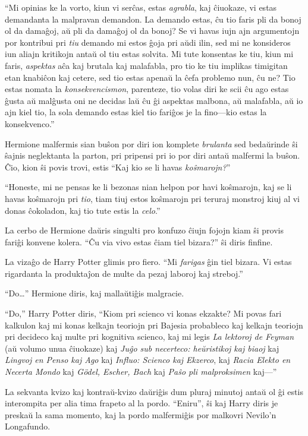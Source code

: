 ``Mi opinias ke la vorto, kiun vi serĉas, estas \emph{agrabla}, kaj
ĉiuokaze, vi estas demandanta la malpravan demandon. La demando estas,
ĉu tio faris pli da bonoj ol da damaĝoj, aŭ pli da damaĝoj ol da
bonoj? Se vi havas iujn ajn argumentojn por kontribui pri \emph{tiu}
demando mi estos ĝoja pri aŭdi ilin, sed mi ne konsideros iun aliajn
kritikojn antaŭ ol tiu estas solvita. Mi tute konsentas ke tiu, kiun
mi faris, \emph{aspektas} aĉa kaj brutala kaj malafabla, pro tio ke
tiu implikas timigitan etan knabiĉon kaj cetere, sed tio estas apenaŭ
la ĉefa problemo nun, ĉu ne? Tio estas nomata la
\emph{konsekvencismon}, parenteze, tio volas diri ke scii ĉu ago estas
ĝusta aŭ malĝusta oni ne decidas laŭ ĉu ĝi aspektas malbona, aŭ
malafabla, aŭ io ajn kiel tio, la sola demando estas kiel tio fariĝos
je la fino—kio estas la konsekvenco.''

Hermione malfermis sian buŝon por diri ion komplete \emph{brulanta}
sed bedaŭrinde ŝi ŝajnis neglektanta la parton, pri pripensi pri io
por diri antaŭ malfermi la buŝon. Ĉio, kion ŝi povis trovi, estis
``Kaj kio se li havas \emph{koŝmarojn?}''

``Honeste, mi ne pensas ke li bezonas nian helpon por havi koŝmarojn,
kaj se li havas koŝmarojn pri \emph{tio}, tiam tiuj estos koŝmarojn
pri teruraj monstroj kiuj al vi donas ĉokoladon, kaj tio tute estis la
\emph{celo}.''

La cerbo de Hermione daŭris singulti pro konfuzo ĉiujn fojojn kiam ŝi
provis fariĝi konvene kolera. ``Ĉu via vivo estas ĉiam tiel bizara?''
ŝi diris finfine.

La vizaĝo de Harry Potter glimis pro fiero. ``Mi \emph{farigas} ĝin
tiel bizara. Vi estas rigardanta la produktaĵon de multe da pezaj
laboroj kaj streboj.''

``Do\ldots'' Hermione diris, kaj mallaŭtiĝis malgracie.

``Do,'' Harry Potter diris, ``Kiom pri scienco vi konas ekzakte? Mi
povas fari kalkulon kaj mi konas kelkajn teoriojn pri Bajesia
probableco kaj kelkajn teoriojn pri decideco kaj multe pri kognitiva
scienco, kaj mi legis \emph{La lektoroj de Feyman} (aŭ volumo unua
ĉiuokaze) kaj \emph{Juĝo sub necerteco: heŭristikoj kaj biaoj} kaj
\emph{Lingvoj en Penso kaj Ago} kaj \emph{Influo: Scienco kaj
  Ekzerco}, kaj \emph{Racia Elekto en Necerta Mondo} kaj \emph{Gödel,
  Escher, Bach} kaj \emph{Paŝo pli malproksimen} kaj—''

La sekvanta kvizo kaj kontraŭ-kvizo daŭriĝis dum pluraj minutoj antaŭ
ol ĝi estis interompita per alia tima frapeto al la pordo. ``Eniru'',
ŝi kaj Harry diris je preskaŭ la sama momento, kaj la pordo
malfermiĝis por malkovri Nevilo'n Longafundo.

